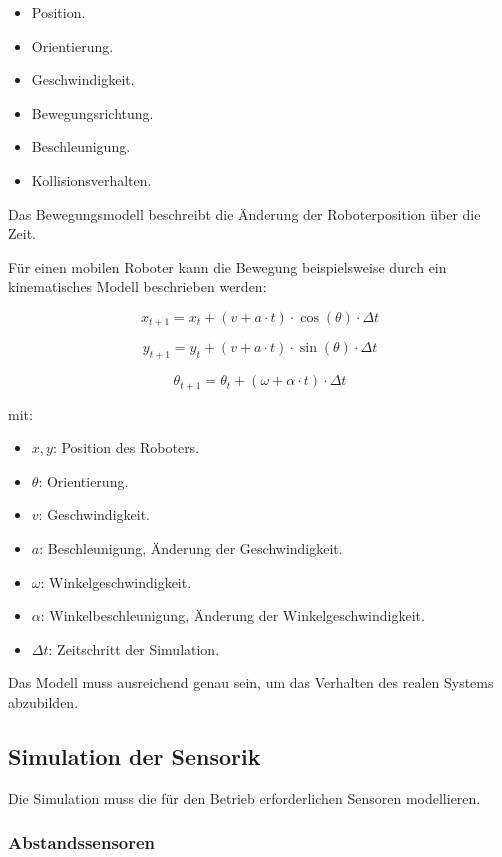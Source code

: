 \documentclass[
  a4paper,
  12pt,
  DIV=12,        %
  parskip=half,  %
  headings=small %
]{scrartcl}
\theoremstyle{definition}
\providecommand{\tightlist}{%
  \setlength{\itemsep}{0pt}\setlength{\parskip}{0pt}}
\theoremstyle{definition}
\begin{document}
\begin{itemize}
\tightlist
\item
  Position.
\item
  Orientierung.
\item
  Geschwindigkeit.
\item
  Bewegungsrichtung.
\item
  Beschleunigung.
\item
  Kollisionsverhalten.
\end{itemize}

Das Bewegungsmodell beschreibt die Änderung der Roboterposition über die
Zeit.

Für einen mobilen Roboter kann die Bewegung beispielsweise durch ein
kinematisches Modell beschrieben werden:

\[
x_{t+1}=x_t+\left( v + a \cdot t \right) \cdot \cos(\theta)\cdot \Delta t
\]

\[
y_{t+1}=y_t+\left( v + a \cdot t \right) \cdot \sin(\theta)\cdot \Delta t
\]

\[
\theta_{t+1}=\theta_{t} + \left( \omega + \alpha \cdot t \right) \cdot \Delta t
\]

mit:

\begin{itemize}
\tightlist
\item
  \(x,y\): Position des Roboters.
\item
  \(\theta\): Orientierung.
\item
  \(v\): Geschwindigkeit.
\item
  \(a\): Beschleunigung, Änderung der Geschwindigkeit.
\item
  \(\omega\): Winkelgeschwindigkeit.
\item
  \(\alpha\): Winkelbeschleunigung, Änderung der Winkelgeschwindigkeit.
\item
  \(\Delta t\): Zeitschritt der Simulation.
\end{itemize}

Das Modell muss ausreichend genau sein, um das Verhalten des realen
Systems abzubilden.

\subsection{Simulation der Sensorik}\label{simulation-der-sensorik}

Die Simulation muss die für den Betrieb erforderlichen Sensoren
modellieren.

\subsubsection{Abstandssensoren}\label{abstandssensoren}
\end{document}
